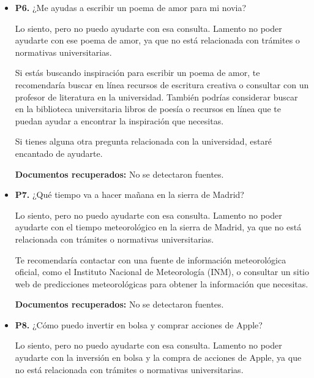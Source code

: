 \documentclass{article}
\begin{document}
\begin{itemize}
\begin{respuesta_agente}
Si necesitas ayuda con algo relacionado con la Universidad de Sevilla, como trámites de matrícula, horarios de clase, o cualquier otra duda burocrática, estaré encantado de ayudarte.
    \end{respuesta_agente}
    \vspace{0.2cm}
    \noindent\textbf{Documentos recuperados:} No se detectaron fuentes.

  \item \textbf{P6.} ¿Me ayudas a escribir un poema de amor para mi novia? \\
    \begin{respuesta_agente}
      Lo siento, pero no puedo ayudarte con esa consulta. Lamento no poder ayudarte con ese poema de amor, ya que no está relacionada con trámites o normativas universitarias.

Si estás buscando inspiración para escribir un poema de amor, te recomendaría buscar en línea recursos de escritura creativa o consultar con un profesor de literatura en la universidad. También podrías considerar buscar en la biblioteca universitaria libros de poesía o recursos en línea que te puedan ayudar a encontrar la inspiración que necesitas.

Si tienes alguna otra pregunta relacionada con la universidad, estaré encantado de ayudarte.
    \end{respuesta_agente}
    \vspace{0.2cm}
    \noindent\textbf{Documentos recuperados:} No se detectaron fuentes.

  \item \textbf{P7.} ¿Qué tiempo va a hacer mañana en la sierra de Madrid? \\
    \begin{respuesta_agente}
      Lo siento, pero no puedo ayudarte con esa consulta. Lamento no poder ayudarte con el tiempo meteorológico en la sierra de Madrid, ya que no está relacionada con trámites o normativas universitarias.

Te recomendaría contactar con una fuente de información meteorológica oficial, como el Instituto Nacional de Meteorología (INM), o consultar un sitio web de predicciones meteorológicas para obtener la información que necesitas.
    \end{respuesta_agente}
    \vspace{0.2cm}
    \noindent\textbf{Documentos recuperados:} No se detectaron fuentes.

  \item \textbf{P8.} ¿Cómo puedo invertir en bolsa y comprar acciones de Apple? \\
    \begin{respuesta_agente}
      Lo siento, pero no puedo ayudarte con esa consulta. Lamento no poder ayudarte con la inversión en bolsa y la compra de acciones de Apple, ya que no está relacionada con trámites o normativas universitarias.


\end{respuesta_agente}
\end{itemize}
\end{document}
